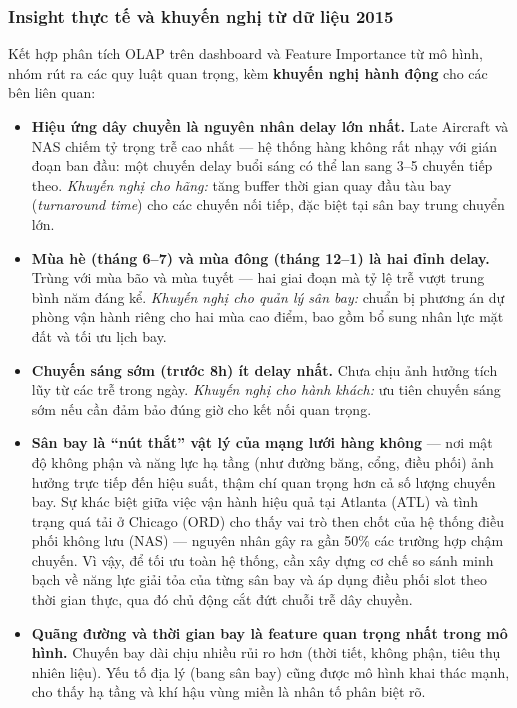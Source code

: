 \subsubsection{Insight thực tế và khuyến nghị từ dữ liệu 2015}

Kết hợp phân tích OLAP trên dashboard và Feature Importance từ mô hình,
nhóm rút ra các quy luật quan trọng, kèm \textbf{khuyến nghị hành động}
cho các bên liên quan:

\begin{itemize}
    \item \textbf{Hiệu ứng dây chuyền là nguyên nhân delay lớn nhất.}
          Late Aircraft và NAS chiếm tỷ trọng trễ cao nhất ---
          hệ thống hàng không rất nhạy với gián đoạn ban đầu:
          một chuyến delay buổi sáng có thể lan sang 3--5 chuyến tiếp theo.
          \textit{Khuyến nghị cho hãng:} tăng buffer thời gian quay đầu tàu bay
          (\textit{turnaround time}) cho các chuyến nối tiếp,
          đặc biệt tại sân bay trung chuyển lớn.

    \item \textbf{Mùa hè (tháng 6--7) và mùa đông (tháng 12--1) là hai đỉnh delay.}
          Trùng với mùa bão và mùa tuyết --- hai giai đoạn mà tỷ lệ trễ
          vượt trung bình năm đáng kể.
          \textit{Khuyến nghị cho quản lý sân bay:} chuẩn bị phương án
          dự phòng vận hành riêng cho hai mùa cao điểm,
          bao gồm bổ sung nhân lực mặt đất và tối ưu lịch bay.

    \item \textbf{Chuyến sáng sớm (trước 8h) ít delay nhất.}
          Chưa chịu ảnh hưởng tích lũy từ các trễ trong ngày.
          \textit{Khuyến nghị cho hành khách:} ưu tiên chuyến sáng sớm
          nếu cần đảm bảo đúng giờ cho kết nối quan trọng.

    \item \textbf{Sân bay là “nút thắt” vật lý của mạng lưới hàng không}
          --- nơi mật độ không phận và năng lực hạ tầng (như đường băng, cổng, điều phối) ảnh hưởng trực tiếp đến hiệu suất, 
          thậm chí quan trọng hơn cả số lượng chuyến bay. Sự khác biệt giữa việc vận hành hiệu quả tại Atlanta (ATL) và tình trạng quá tải ở Chicago (ORD) cho thấy vai trò then chốt của hệ thống điều phối không lưu (NAS) 
          — nguyên nhân gây ra gần 50\% các trường hợp chậm chuyến. Vì vậy, để tối ưu toàn hệ thống, cần xây dựng cơ chế so sánh minh bạch về năng lực giải tỏa của từng sân bay và áp dụng điều phối slot theo thời gian thực, 
          qua đó chủ động cắt đứt chuỗi trễ dây chuyền.

    \item \textbf{Quãng đường và thời gian bay là feature quan trọng nhất trong mô hình.}
          Chuyến bay dài chịu nhiều rủi ro hơn (thời tiết, không phận, tiêu thụ nhiên liệu).
          Yếu tố địa lý (bang sân bay) cũng được mô hình khai thác mạnh,
          cho thấy hạ tầng và khí hậu vùng miền là nhân tố phân biệt rõ.
\end{itemize}

